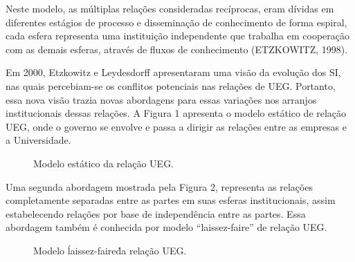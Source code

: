 Neste modelo, as múltiplas relações consideradas recíprocas, eram dívidas em diferentes estágios de processo e disseminação de conhecimento de forma espiral, cada esfera representa uma instituição independente que trabalha em cooperação com as demais esferas, através de fluxos de conhecimento (ETZKOWITZ, 1998).

Em 2000, Etzkowitz e Leydesdorff apresentaram uma visão da evolução dos SI, nas quais percebiam-se os conflitos potenciais nas relações de UEG. Portanto, essa nova visão trazia novas abordagens para essas variações nos arranjos institucionais dessas relações. A Figura 1 apresenta o modelo estático de relação UEG, onde o governo se envolve e passa a dirigir as relações entre as empresas e a Universidade.


\begin{figure}[ht]
  \centering
  \caption{Modelo estático da relação UEG.}
  \label{crescimento_odf}
\end{figure}

Uma segunda abordagem mostrada pela Figura 2, representa as relações completamente separadas entre as partes em suas esferas institucionais, assim estabelecendo relações por base de independência entre as partes. Essa abordagem também é conhecida por modelo “laissez-faire” de relação UEG.


\begin{figure}[ht]
  \centering
  \caption{Modelo \'laissez-faire\' da relação UEG.}
  \label{crescimento_odf}
\end{figure}

